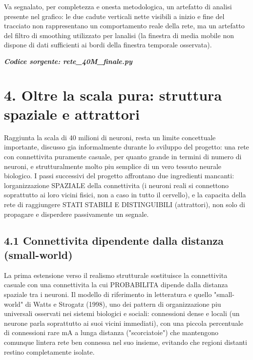 \documentclass[
  italian,
]{article}
\begin{document}
Va segnalato, per completezza e onesta\textquotesingle{} metodologica, un artefatto di analisi presente nel grafico: le due cadute verticali nette visibili a inizio e fine del tracciato non rappresentano un comportamento reale della rete, ma un artefatto del filtro di smoothing utilizzato per l\textquotesingle analisi (la finestra di media mobile non dispone di dati sufficienti ai bordi della finestra temporale osservata).

\textit{\textbf{Codice sorgente: rete\_\allowbreak{}40M\_\allowbreak{}finale.py}}


\section{4. Oltre la scala pura: struttura spaziale e attrattori}\label{oltre-la-scala-pura-struttura-spaziale-e-attrattori}

Raggiunta la scala di 40 milioni di neuroni, resta un limite concettuale importante, discusso gia\textquotesingle{} informalmente durante lo sviluppo del progetto: una rete con connettivita\textquotesingle{} puramente casuale, per quanto grande in termini di numero di neuroni, e\textquotesingle{} strutturalmente molto piu\textquotesingle{} semplice di un vero tessuto neurale biologico. I passi successivi del progetto affrontano due ingredienti mancanti: l\textquotesingle organizzazione SPAZIALE della connettivita\textquotesingle{} (i neuroni reali si connettono soprattutto ai loro vicini fisici, non a caso in tutto il cervello), e la capacita\textquotesingle{} della rete di raggiungere STATI STABILI E DISTINGUIBILI (attrattori), non solo di propagare e disperdere passivamente un segnale.

\subsection{4.1 Connettivita\textquotesingle{} dipendente dalla distanza (small-world)}\label{connettivita-dipendente-dalla-distanza-small-world}

La prima estensione verso il realismo strutturale sostituisce la connettivita\textquotesingle{} casuale con una connettivita\textquotesingle{} la cui PROBABILITA\textquotesingle{} dipende dalla distanza spaziale tra i neuroni. Il modello di riferimento in letteratura e\textquotesingle{} quello "small-world" di Watts e Strogatz (1998), uno dei pattern di organizzazione piu\textquotesingle{} universali osservati nei sistemi biologici e sociali: connessioni dense e locali (un neurone parla soprattutto ai suoi vicini immediati), con una piccola percentuale di connessioni rare mA a lunga distanza ("scorciatoie") che mantengono comunque l\textquotesingle intera rete ben connessa nel suo insieme, evitando che regioni distanti restino completamente isolate.
\end{document}
